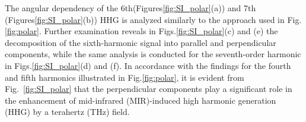 The angular dependency of the 6th(Figures\ref{fig:SI_polar}(a)) and 7th (Figures\ref{fig:SI_polar}(b)) \gls{HHG} is analyzed similarly to the approach used in Fig.\ref{fig:polar}. Further examination reveals in Figs.\ref{fig:SI_polar}(c) and (e) the decomposition of the sixth-harmonic signal into parallel and perpendicular components, while the same analysis is conducted for the seventh-order harmonic in Figs.\ref{fig:SI_polar}(d) and (f). In accordance with the findings for the fourth and fifth harmonics illustrated in Fig.\ref{fig:polar}, it is evident from Fig.~\ref{fig:SI_polar} that the perpendicular components play a significant role in the enhancement of mid-infrared (MIR)-induced high harmonic generation (HHG) by a terahertz (THz) field.

